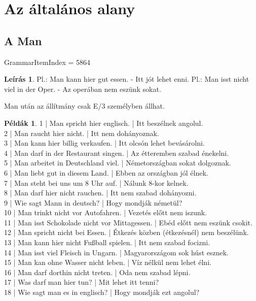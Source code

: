 \documentclass{article}
\theoremstyle{definition}
\newtheorem*{exmp}{Példák}
\newtheorem*{desc}{Leírás}
\begin{document}
\section{Az általános alany}

\subsection{A Man}

GrammarItemIndex = 5864

\begin{desc}
Pl.: Man kann hier gut essen. - Itt jót lehet enni.
Pl.: Man isst nicht viel in der Oper. - Az operában nem eszünk sokat. 

Man után az állítmány csak E/3 személyben állhat.
\end{desc}

\begin{exmp}
1 | Man spricht hier englisch. | Itt beszélnek angolul.\\
2 | Man raucht hier nicht. | Itt nem dohányoznak.\\
3 | Man kann hier billig verkaufen. | Itt olcsón lehet bevásárolni.\\
4 | Man darf in der Restaurant singen. | Az étteremben szabad énekelni.\\
5 | Man arbeitet in Deutschland viel. | Németországban sokat dolgoznak.\\
6 | Man liebt gut in diesem Land. | Ebben az országban jól élnek.\\
7 | Man steht bei uns um 8 Uhr auf. | Nálunk 8-kor kelnek.\\
8 | Man darf hier nicht rauchen. | Itt nem szabad dohányozni.\\
9 | Wie sagt Mann in deutsch? | Hogy mondják németül?\\
10 | Man trinkt nicht vor Autofahren. | Vezetés előtt nem iszunk.\\
11 | Man isst Schokolade nicht vor Mittagessen. | Ebéd előtt nem eszünk csokit.\\
12 | Man spricht nicht bei Essen. | Étkezés közben (étkezésnél) nem beszélünk.\\
13 | Man kann hier nicht Fußball spielen. | Itt nem szabad focizni.\\
14 | Man isst viel Fleisch in Ungarn. | Magyarországom sok húst esznek.\\
15 | Man kan ohne Wasser nicht leben. | Víz nélkül nem lehet élni.\\
16 | Man darf dorthin nicht treten. | Oda nem szabad lépni.\\
17 | Was darf man hier tun? | Mit lehet itt tenni?\\
18 | Wie sagt man es in englisch? | Hogy mondják ezt angolul?\\
\end{exmp}
\end{document}
